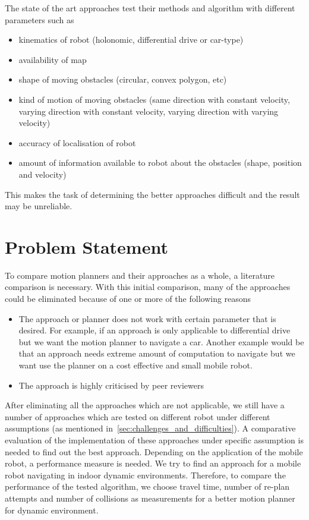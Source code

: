 The state of the art approaches test their methods and algorithm with different parameters such as
    \begin{itemize}
        \item kinematics of robot (holonomic, differential drive or car-type)
        \item availability of map
        \item shape of moving obstacles (circular, convex polygon, etc)
        \item kind of motion of moving obstacles (same direction with constant velocity, varying
            direction with constant velocity, varying direction with varying velocity)
        \item accuracy of localisation of robot
        \item amount of information available to robot about the obstacles (shape, position and velocity)
    \end{itemize}
This makes the task of determining the better approaches difficult and the result may be unreliable.



\section{Problem Statement}
\label{sec:problem_statement}
To compare motion planners and their approaches as a whole, a literature comparison is necessary.
With this initial comparison, many of the approaches could be eliminated because of one or more of
the following reasons
\begin{itemize}
    \item The approach or planner does not work with certain parameter that is desired. For example, 
        if an approach is only applicable to differential drive but we want the motion planner to 
        navigate a car. Another example would be that an approach needs extreme amount of computation
        to navigate but we want use the planner on a cost effective and small mobile robot.
    \item The approach is highly criticised by peer reviewers
\end{itemize} 
After eliminating all the approaches which are not applicable, we still have a number of approaches
which are tested on different robot under different assumptions (as mentioned in~\ref{sec:challenges_and_difficulties}).
A comparative evaluation of the implementation of these approaches under specific assumption is 
needed to find out the best approach. Depending on the application of the mobile robot, a performance
measure is needed. We try to find an approach for a mobile robot navigating in indoor dynamic environments.
Therefore, to compare the performance of the tested algorithm, we choose
travel time, number of re-plan attempts and number of collisions as measurements for a better motion
planner for dynamic environment.

